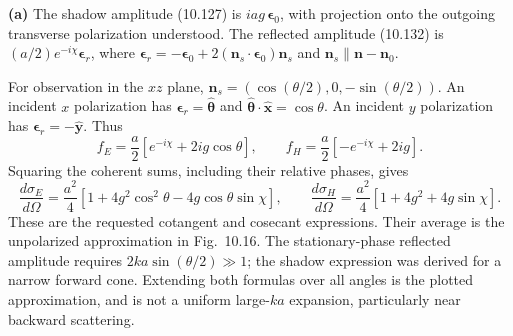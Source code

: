 \textbf{(a)} The shadow amplitude (10.127) is
$ia g\,\boldsymbol\epsilon_0$, with projection onto the outgoing
transverse polarization understood. The reflected amplitude (10.132) is
$(a/2)e^{-i\chi}\boldsymbol\epsilon_r$, where
$\boldsymbol\epsilon_r=-\boldsymbol\epsilon_0+
2(\mathbf n_s\cdot\boldsymbol\epsilon_0)\mathbf n_s$ and
$\mathbf n_s\parallel\mathbf n-\mathbf n_0$.

For observation in the $xz$ plane,
$\mathbf n_s=(\cos(\theta/2),0,-\sin(\theta/2))$.
An incident $x$ polarization has
$\boldsymbol\epsilon_r=\widehat{\boldsymbol\theta}$ and
$\widehat{\boldsymbol\theta}\cdot\widehat{\mathbf x}=\cos\theta$.
An incident $y$ polarization has
$\boldsymbol\epsilon_r=-\widehat{\mathbf y}$. Thus
\[
f_E=\frac a2[e^{-i\chi}+2ig\cos\theta],\qquad
f_H=\frac a2[-e^{-i\chi}+2ig].
\]
Squaring the coherent sums, including their relative phases, gives
\[
\boxed{\frac{d\sigma_E}{d\Omega}=\frac{a^2}{4}
[1+4g^2\cos^2\theta-4g\cos\theta\sin\chi],}
\qquad
\boxed{\frac{d\sigma_H}{d\Omega}=\frac{a^2}{4}
[1+4g^2+4g\sin\chi].}
\]
These are the requested cotangent and cosecant expressions.
Their average is the unpolarized approximation in Fig.~10.16.
The stationary-phase reflected amplitude requires
$2ka\sin(\theta/2)\gg1$; the shadow expression was derived for a narrow
forward cone. Extending both formulas over all angles is the plotted
approximation, and is not a uniform large-$ka$ expansion, particularly
near backward scattering.

